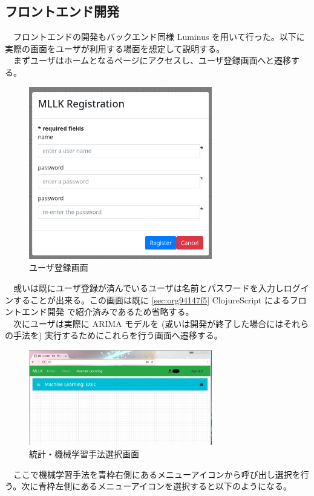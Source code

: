 \documentclass[dvipdfmx]{scrartcl}
\begin{document}
\subsection{フロントエンド開発}
\label{sec:orga6af761}
　フロントエンドの開発もバックエンド同様 Luminus を用いて行った。以下に実際の画面をユーザが利用する場面を想定して説明する。\\
　まずユーザはホームとなるページにアクセスし、ユーザ登録画面へと遷移する。\\
\begin{figure}[htbp]
\centering
\includegraphics[width=8cm]{./register.PNG}
\caption{ユーザ登録画面}
\end{figure}

　或いは既にユーザ登録が済んでいるユーザは名前とパスワードを入力しログインすることが出来る。この画面は既に \ref{sec:org94147f5} ClojureScript によるフロントエンド開発 で紹介済みであるため省略する。\\
　次にユーザは実際に ARIMA モデルを (或いは開発が終了した場合にはそれらの手法を) 実行するためにこれらを行う画面へ遷移する。\\
\begin{figure}[htbp]
\centering
\includegraphics[width=8cm]{./ml-view.PNG}
\caption{統計・機械学習手法選択画面}
\end{figure}

　ここで機械学習手法を青枠右側にあるメニューアイコンから呼び出し選択を行う。次に青枠左側にあるメニューアイコンを選択すると以下のようになる。\\
\end{document}
